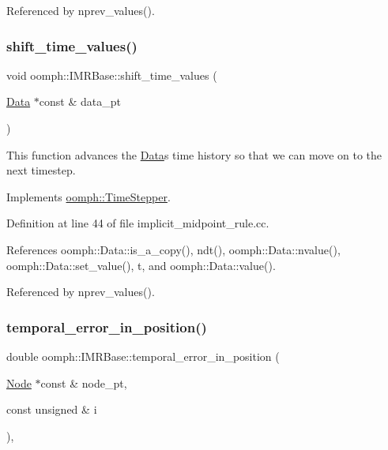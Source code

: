 Referenced by nprev\+\_\+values().

\mbox{\label{classoomph_1_1IMRBase_a34c72011189de014a69288fbcfac54f4}} 
\subsubsection{\texorpdfstring{shift\+\_\+time\+\_\+values()}{shift\_time\_values()}}
{\footnotesize\ttfamily void oomph\+::\+I\+M\+R\+Base\+::shift\+\_\+time\+\_\+values (\begin{DoxyParamCaption}\item[{\hyperlink{classoomph_1_1Data}{Data} $\ast$const \&}]{data\+\_\+pt }\end{DoxyParamCaption})\hspace{0.3cm}{\ttfamily [virtual]}}



This function advances the \hyperlink{classoomph_1_1Data}{Data}\textquotesingle{}s time history so that we can move on to the next timestep. 



Implements \hyperlink{classoomph_1_1TimeStepper_a010a3b03a23a1c48dd8ca10641427255}{oomph\+::\+Time\+Stepper}.



Definition at line 44 of file implicit\+\_\+midpoint\+\_\+rule.\+cc.



References oomph\+::\+Data\+::is\+\_\+a\+\_\+copy(), ndt(), oomph\+::\+Data\+::nvalue(), oomph\+::\+Data\+::set\+\_\+value(), t, and oomph\+::\+Data\+::value().



Referenced by nprev\+\_\+values().

\mbox{\label{classoomph_1_1IMRBase_a6e57fd5364c261cd7c1bd49688899a13}} 
\subsubsection{\texorpdfstring{temporal\+\_\+error\+\_\+in\+\_\+position()}{temporal\_error\_in\_position()}}
{\footnotesize\ttfamily double oomph\+::\+I\+M\+R\+Base\+::temporal\+\_\+error\+\_\+in\+\_\+position (\begin{DoxyParamCaption}\item[{\hyperlink{classoomph_1_1Node}{Node} $\ast$const \&}]{node\+\_\+pt,  }\item[{const unsigned \&}]{i }\end{DoxyParamCaption})\hspace{0.3cm}{\ttfamily [inline]}, {\ttfamily [virtual]}}

